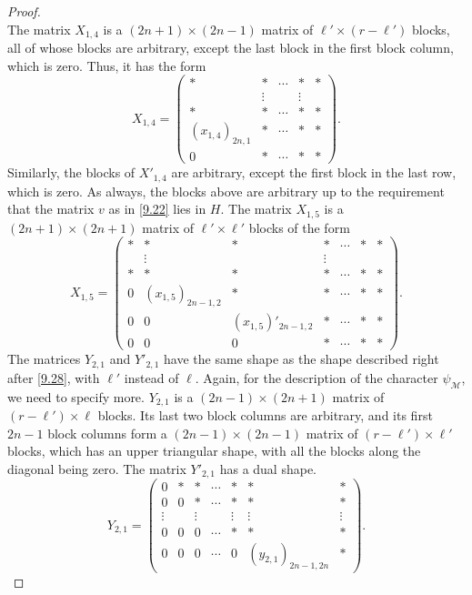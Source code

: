\documentclass[12pts]{amsart}
\begin{document}
\begin{proof}
\begin{equation}
\end{equation}
The matrix $X_{1,4}$ is a $(2n+1)\times (2n-1)$ matrix of $\ell'\times (r-\ell')$ blocks, all of whose blocks are arbitrary, except the last block in the first block column, which is zero. Thus, it has the form
\begin{equation}\label{9.76}
X_{1,4}=\begin{pmatrix}\ast&\ast&\cdots&\ast&\ast\\
&\vdots&&\vdots\\\ast&\ast&\cdots&\ast&\ast\\(x_{1,4})_{2n,1}&\ast&\cdots&\ast&\ast\\0&\ast&\cdots&\ast&\ast\end{pmatrix}.
\end{equation}
Similarly, the blocks of $X'_{1,4}$ are arbitrary, except the first block in the last row, which is zero. As always, the blocks above are arbitrary up to the requirement that the matrix $v$ as in \eqref{9.22} lies in $H$. The matrix $X_{1,5}$ is a $(2n+1)\times (2n+1)$ matrix of $\ell'\times \ell'$ blocks of the form
\begin{equation}\label{9.77}
X_{1,5}=\begin{pmatrix}\ast&\ast&\ast&\ast&\cdots&\ast&\ast\\
&\vdots&&\vdots\\\ast&\ast&\ast&\ast&\cdots&\ast&\ast\\0&(x_{1,5})_{2n-1,2}&\ast&\ast&\cdots&\ast&\ast\\0&0&(x_{1,5})'_{2n-1,2}&\ast&\cdots&\ast&\ast\\0&0&0&\ast&\cdots&\ast&\ast\end{pmatrix}.
\end{equation}
The matrices $Y_{2,1}$ and $Y'_{2,1}$ have the same shape as the shape described right after \eqref{9.28}, with $\ell'$ instead of $\ell$. Again, for the description of the character $\psi_{\mathcal{M}}$, we need to specify more. $Y_{2,1}$ is a $(2n-1)\times (2n+1)$ matrix of $(r-\ell')\times\ell$ blocks. Its last two block columns are arbitrary, and its first $2n-1$ block columns form a $(2n-1)\times (2n-1)$ matrix of $(r-\ell')\times \ell'$ blocks, which has an upper triangular shape, with all the blocks along the diagonal being zero. The matrix $Y'_{2,1}$ has a dual shape. 
\begin{equation}\label{9.78}
Y_{2,1}=\begin{pmatrix}0&\ast&\ast&\cdots&\ast&\ast&\ast\\0&0&\ast&\cdots&\ast&\ast&\ast\\\vdots&&\vdots&&\vdots&\vdots&\vdots\\0&0&0&\cdots&\ast&\ast&\ast\\0&0&0&\cdots&0&(y_{2,1})_{2n-1,2n}&\ast\end{pmatrix}.

\end{equation}
\end{proof}
\end{document}
